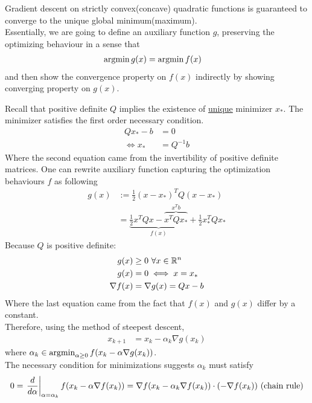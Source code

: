 \documentclass{article}
\begin{document}
	\begin{theorem}
		Gradient descent on  strictly convex(concave) quadratic functions is guaranteed to converge to the unique global minimum(maximum). \\
		Essentially, we are going to define an auxiliary function $g$, preserving the optimizing behaviour in a sense that
		\begin{align}
			\operatorname*{argmin} g(x) &= \operatorname*{argmin} f(x)
		\end{align}
		and then show the convergence property on $f(x)$ indirectly by showing converging property on $g(x)$.
	\end{theorem}
	
	\begin{lemma}
		Recall that positive definite $Q$ implies the existence of \ul{unique} minimizer $x_*$. The minimizer satisfies the first order necessary condition.
		\begin{align}
			Q x_* - b &= 0 \\
			\iff x_* &= Q^{-1} b
		\end{align}
		Where the second equation came from the invertibility of positive definite matrices.
		One can rewrite auxiliary function capturing the optimization behaviours $f$ as following 
		\begin{align}
			g(x) &:= \frac{1}{2} (x - x_*)^T Q (x - x_*) \\
			&= \underbrace{\frac{1}{2} x^T Q x - \overbrace{x^T Q x_*}^{x^T b}}_{f(x)} + \frac{1}{2} x_*^T Q x_*
		\end{align}
		Because $Q$ is positive definite:
		\begin{align}
			g(x) &\geq 0\ \forall x \in \mathbb{R}^n \\
			g(x) &= 0 \iff x = x_*\\
			\nabla f(x) &= \nabla g(x) = Q x - b
		\end{align}
		Where the last equation came from the fact that $f(x)$ and $g(x)$ differ by a constant.\\
		Therefore, using the method of steepest descent,
		\begin{align}
			x_{k+1} &= x_k - \alpha_k \nabla g(x_k)
		\end{align}
		where $\alpha_k \in \operatorname*{argmin}_{\alpha \geq 0}f(x_k - \alpha \nabla g(x_k))$. \\
		The necessary condition for minimizations suggests $\alpha_k$ must satisfy
		\begin{align}
			0 = \left. \frac{d}{d\alpha}\right|_{\alpha = \alpha_k} f(x_k - \alpha \nabla f(x_k)) 
			&= \nabla f(x_k - \alpha_k \nabla f(x_k)) \cdot (-\nabla f(x_k)) \tx{ (chain rule)}\\

\end{align}
\end{lemma}
\end{document}

